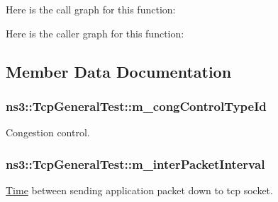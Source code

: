 Here is the call graph for this function\+:




Here is the caller graph for this function\+:




\subsection{Member Data Documentation}
\subsubsection[{\texorpdfstring{m\+\_\+cong\+Control\+Type\+Id}{m_congControlTypeId}}]{ ns3\+::\+Tcp\+General\+Test\+::m\+\_\+cong\+Control\+Type\+Id\hspace{0.3cm}{\ttfamily [protected]}}\hypertarget{classns3_1_1TcpGeneralTest_aa85b87bfde4d43e1f799f297fe689a8d}{}\label{classns3_1_1TcpGeneralTest_aa85b87bfde4d43e1f799f297fe689a8d}


Congestion control. 

\subsubsection[{\texorpdfstring{m\+\_\+inter\+Packet\+Interval}{m_interPacketInterval}}]{ ns3\+::\+Tcp\+General\+Test\+::m\+\_\+inter\+Packet\+Interval\hspace{0.3cm}{\ttfamily [private]}}\hypertarget{classns3_1_1TcpGeneralTest_a4c4f8fdf19afaec2c644f2162d19e6d4}{}\label{classns3_1_1TcpGeneralTest_a4c4f8fdf19afaec2c644f2162d19e6d4}


\hyperlink{classns3_1_1Time}{Time} between sending application packet down to tcp socket. 

